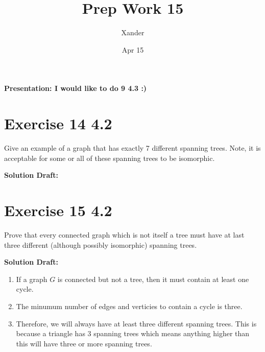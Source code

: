 \documentclass{article}
\title{Prep Work 15}
\author{Xander}
\date{Apr 15}
\begin{document}
\maketitle
\noindent\textbf{Presentation: I would like to do 9 4.3 :)} 


\section*{Exercise 14 4.2}  

Give an example of a graph that has exactly 7 different spanning trees. Note, it is acceptable for some or all of these spanning trees to be isomorphic.


\vspace{0.5cm}
\noindent\textbf{Solution Draft:} 
\vspace{0.2cm}

\section*{Exercise 15 4.2}  

Prove that every connected graph which is not itself a tree must have at last three different (although possibly isomorphic) spanning trees.


\vspace{0.5cm}
\noindent\textbf{Solution Draft:} 
\vspace{0.2cm}

\begin{enumerate}
    \item If a graph $G$ is connected but not a tree, then it must contain at least one cycle. 
    \item The minumum number of edges and verticies to contain a cycle is three.
    \item Therefore, we will always have at least three different spanning trees. This is because a triangle has 3 spanning trees which means anything higher than this will have three or more spanning trees.
\end{enumerate}
\end{document}
